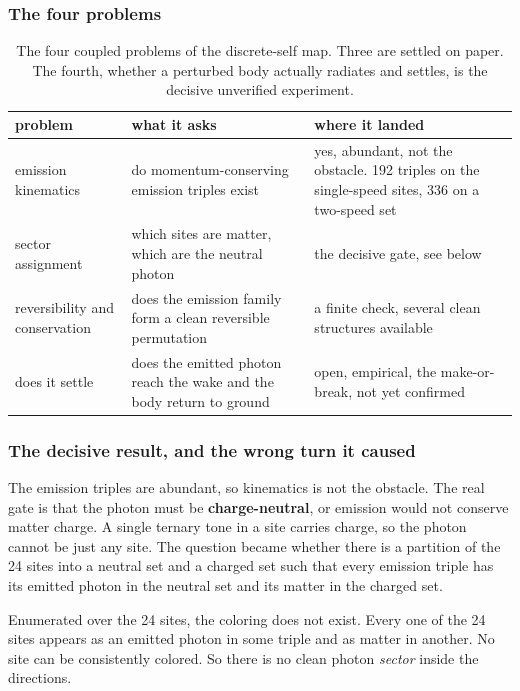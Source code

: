 \subsubsection{The four problems}

\begin{table}[ht]
\centering
\begin{tabular}{@{}p{}p{}p{}@{}}
\toprule
problem & what it asks & where it landed \\
\midrule
emission kinematics & do momentum-conserving emission triples exist & yes, abundant, not the obstacle. 192 triples on the single-speed sites, 336 on a two-speed set \\
sector assignment & which sites are matter, which are the neutral photon & the decisive gate, see below \\
reversibility and conservation & does the emission family form a clean reversible permutation & a finite check, several clean structures available \\
does it settle & does the emitted photon reach the wake and the body return to ground & open, empirical, the make-or-break, not yet confirmed \\
\bottomrule
\end{tabular}
\caption{The four coupled problems of the discrete-self map. Three are settled on paper. The fourth, whether a perturbed body actually radiates and settles, is the decisive unverified experiment.}
\label{tab:four-problems}
\end{table}

\subsubsection{The decisive result, and the wrong turn it caused}

The emission triples are abundant, so kinematics is not the obstacle. The real gate is that the photon must be \textbf{charge-neutral}, or emission would not conserve matter charge. A single ternary tone in a site carries charge, so the photon cannot be just any site. The question became whether there is a partition of the 24 sites into a neutral set and a charged set such that every emission triple has its emitted photon in the neutral set and its matter in the charged set.

\begin{proposition}
Enumerated over the 24 sites, the coloring does not exist. Every one of the 24 sites appears as an emitted photon in some triple and as matter in another. No site can be consistently colored. So there is no clean photon \emph{sector} inside the directions.
\end{proposition}

